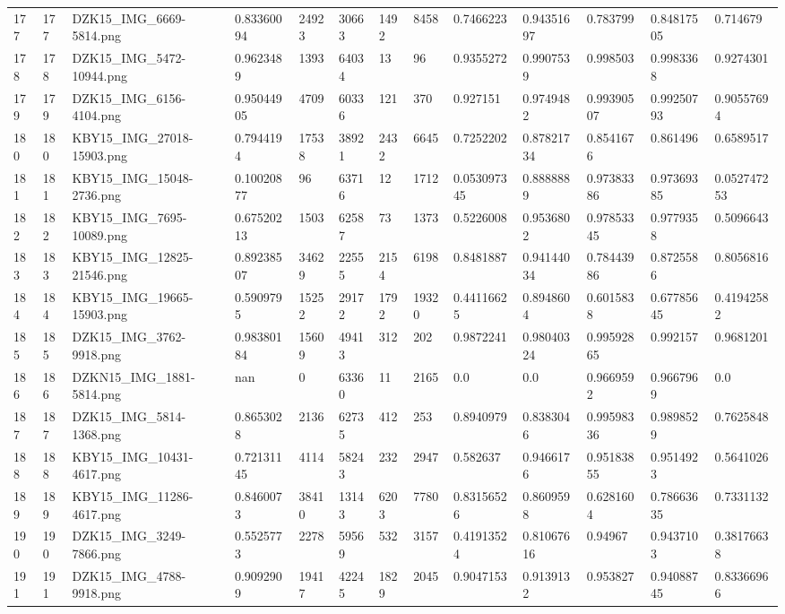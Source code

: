 \documentclass[11pt, a4paper, twoside]{report}
\begin{document}
\begin{longtable}[c]{@{}lllllllllllll@{}}
177 & 177 & DZK15\_IMG\_6669-5814.png & 0.83360094 & 24923 & 30663 & 1492 & 8458 & 0.7466223 & 0.94351697 & 0.783799 & 0.84817505 & 0.714679 \\
178 & 178 & DZK15\_IMG\_5472-10944.png & 0.9623489 & 1393 & 64034 & 13 & 96 & 0.9355272 & 0.9907539 & 0.998503 & 0.9983368 & 0.9274301 \\
179 & 179 & DZK15\_IMG\_6156-4104.png & 0.95044905 & 4709 & 60336 & 121 & 370 & 0.927151 & 0.9749482 & 0.99390507 & 0.99250793 & 0.90557694 \\
180 & 180 & KBY15\_IMG\_27018-15903.png & 0.7944194 & 17538 & 38921 & 2432 & 6645 & 0.7252202 & 0.87821734 & 0.8541676 & 0.861496 & 0.6589517 \\
181 & 181 & KBY15\_IMG\_15048-2736.png & 0.10020877 & 96 & 63716 & 12 & 1712 & 0.053097345 & 0.8888889 & 0.97383386 & 0.97369385 & 0.052747253 \\
182 & 182 & KBY15\_IMG\_7695-10089.png & 0.67520213 & 1503 & 62587 & 73 & 1373 & 0.5226008 & 0.9536802 & 0.97853345 & 0.9779358 & 0.5096643 \\
183 & 183 & KBY15\_IMG\_12825-21546.png & 0.89238507 & 34629 & 22555 & 2154 & 6198 & 0.8481887 & 0.94144034 & 0.78443986 & 0.8725586 & 0.8056816 \\
184 & 184 & KBY15\_IMG\_19665-15903.png & 0.5909795 & 15252 & 29172 & 1792 & 19320 & 0.44116625 & 0.8948604 & 0.6015838 & 0.67785645 & 0.41942582 \\
185 & 185 & DZK15\_IMG\_3762-9918.png & 0.98380184 & 15609 & 49413 & 312 & 202 & 0.9872241 & 0.98040324 & 0.99592865 & 0.992157 & 0.9681201 \\
186 & 186 & DZKN15\_IMG\_1881-5814.png & nan & 0 & 63360 & 11 & 2165 & 0.0 & 0.0 & 0.9669592 & 0.9667969 & 0.0 \\
187 & 187 & DZK15\_IMG\_5814-1368.png & 0.8653028 & 2136 & 62735 & 412 & 253 & 0.8940979 & 0.8383046 & 0.99598336 & 0.9898529 & 0.7625848 \\
188 & 188 & KBY15\_IMG\_10431-4617.png & 0.72131145 & 4114 & 58243 & 232 & 2947 & 0.582637 & 0.9466176 & 0.95183855 & 0.9514923 & 0.5641026 \\
189 & 189 & KBY15\_IMG\_11286-4617.png & 0.8460073 & 38410 & 13143 & 6203 & 7780 & 0.83156526 & 0.8609598 & 0.6281604 & 0.78663635 & 0.7331132 \\
190 & 190 & DZK15\_IMG\_3249-7866.png & 0.5525773 & 2278 & 59569 & 532 & 3157 & 0.41913524 & 0.81067616 & 0.94967 & 0.9437103 & 0.38176638 \\
191 & 191 & DZK15\_IMG\_4788-9918.png & 0.9092909 & 19417 & 42245 & 1829 & 2045 & 0.9047153 & 0.9139132 & 0.953827 & 0.94088745 & 0.83366966 \\

\end{longtable}
\end{document}
